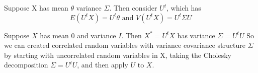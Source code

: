 \documentclass{article}
\begin{document}
Suppose X has mean $\theta$ variance $\Sigma$.  Then consider $U^t$, which has
\[ E(U^tX) = U^t\theta \mbox{ and } V(U^tX) = U^t \Sigma U \]

Suppose $X$ has mean 0 and variance $I$.  Then $X^* = U^tX$ has 
variance $\Sigma = U^tU$
So we can created correlated random variables with variance covariance
structure $\Sigma$ by starting with uncorrelated random variables in X, 
taking the Cholesky decomposition $\Sigma = U^tU$, and then apply $U$ 
to $X$.
\end{document}
